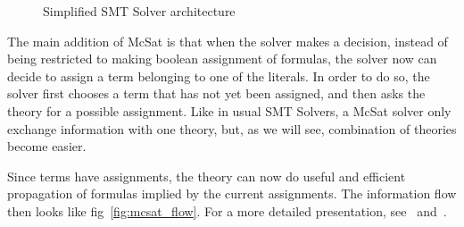 \begin{figure}
  \begin{center}
  \end{center}
  \caption{Simplified SMT Solver architecture}\label{fig:smt_flow}
\end{figure}

The main addition of McSat is that when the solver makes a decision, instead of
being restricted to making boolean assignment of formulas, the solver now can
decide to assign a term belonging to one of the literals. In order to do so,
the solver first chooses a term that has not yet been assigned, and then asks
the theory for a possible assignment. Like in usual SMT Solvers, a McSat solver
only exchange information with one theory, but, as we will see, combination
of theories become easier.

Since terms have assignments, the theory can now do useful and efficient
propagation of formulas implied by the current assignments.
The information flow then looks like fig~\ref{fig:mcsat_flow}.
For a more detailed presentation, see~\cite{FMCAD13} and~\cite{VMCAI13}.

